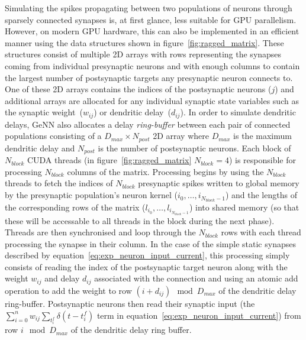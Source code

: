 \documentclass[utf8]{frontiersSCNS} %
\begin{document}
Simulating the spikes propagating between two populations of neurons through sparsely connected synapses is, at first glance, less suitable for GPU parallelism.
However, on modern GPU hardware, this can also be implemented in an efficient manner using the data structures shown in figure~\ref{fig:ragged_matrix}.
These structures consist of multiple 2D arrays with rows representing the synapses coming from individual presynaptic neurons and with enough columns to contain the largest number of postsynaptic targets any presynaptic neuron connects to.
One of these 2D arrays contains the indices of the postsynaptic neurons ($j$) and additional arrays are allocated for any individual synaptic state variables such as the synaptic weight~($w_{ij}$) or dendritic delay~($d_{ij}$).
In order to simulate dendritic delays, GeNN also allocates a delay \textit{ring-buffer} between each pair of connected populations consisting of a $D_{max} \times N_{post}$ 2D array where $D_{max}$ is the maximum dendritic delay and $N_{post}$ is the number of postsynaptic neurons.
Each block of $N_{block}$ CUDA threads (in figure~\ref{fig:ragged_matrix} $N_{block}=4$) is responsible for processing $N_{block}$ columns of the matrix.
Processing begins by using the $N_{block}$ threads to fetch the indices of $N_{block}$ presynaptic spikes written to global memory by the presynaptic population's neuron kernel ($i_{0},\ldots,i_{N_{block} - 1}$) and the lengths of the corresponding rows of the matrix ($l_{i_{0}},\ldots,l_{i_{N_{block} - 1}}$) into shared memory (so that these will be accessable to all threads in the block during the next phase).
Threads are then synchronised and loop through the $N_{block}$ rows with each thread processing the synapse in their column.
In the case of the simple static synapses described by equation~\ref{eq:exp_neuron_input_current}, this processing simply consists of reading the index of the postsynaptic target neuron along with the weight $w_{ij}$ and delay $d_{ij}$ associated with the connection and using an atomic add operation to add the weight to row $(i + d_{ij}) \mod D_{max}$ of the dendritic delay ring-buffer.
Postsynaptic neurons then read their synaptic input (the $\sum_{i=0}^{n} w_{ij} \sum_{t_{i}^{f}} \delta(t - t_{i}^{f})$ term in equation~\ref{eq:exp_neuron_input_current})  from row $i \mod D_{max}$ of the dendritic delay ring buffer.
\end{document}
